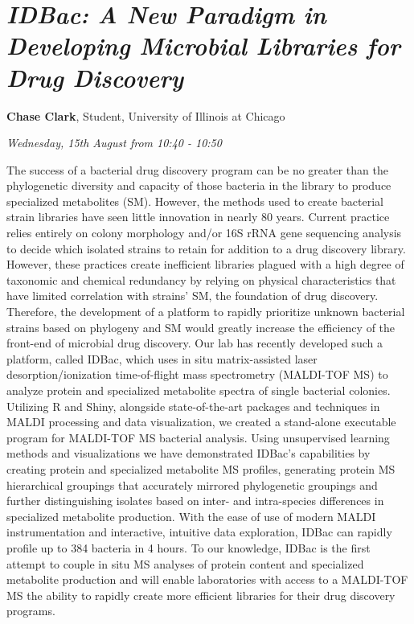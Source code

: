 \documentclass[]{book}
\theoremstyle{definition}
\theoremstyle{definition}
\theoremstyle{definition}
\theoremstyle{remark}
\begin{document}
\hypertarget{idbac-a-new-paradigm-in-developing-microbial-libraries-for-drug-discovery}{%
\section{\texorpdfstring{\emph{IDBac: A New Paradigm in Developing
Microbial Libraries for Drug
Discovery}}{IDBac: A New Paradigm in Developing Microbial Libraries for Drug Discovery}}\label{idbac-a-new-paradigm-in-developing-microbial-libraries-for-drug-discovery}}

\textbf{Chase Clark}, Student, University of Illinois at Chicago

\emph{Wednesday, 15th August from 10:40 - 10:50}

The success of a bacterial drug discovery program can be no greater than
the phylogenetic diversity and capacity of those bacteria in the library
to produce specialized metabolites (SM). However, the methods used to
create bacterial strain libraries have seen little innovation in nearly
80 years. Current practice relies entirely on colony morphology and/or
16S rRNA gene sequencing analysis to decide which isolated strains to
retain for addition to a drug discovery library. However, these
practices create inefficient libraries plagued with a high degree of
taxonomic and chemical redundancy by relying on physical characteristics
that have limited correlation with strains' SM, the foundation of drug
discovery. Therefore, the development of a platform to rapidly
prioritize unknown bacterial strains based on phylogeny and SM would
greatly increase the efficiency of the front-end of microbial drug
discovery. Our lab has recently developed such a platform, called IDBac,
which uses in situ matrix-assisted laser desorption/ionization
time-of-flight mass spectrometry (MALDI-TOF MS) to analyze protein and
specialized metabolite spectra of single bacterial colonies. Utilizing R
and Shiny, alongside state-of-the-art packages and techniques in MALDI
processing and data visualization, we created a stand-alone executable
program for MALDI-TOF MS bacterial analysis. Using unsupervised learning
methods and visualizations we have demonstrated IDBac's capabilities by
creating protein and specialized metabolite MS profiles, generating
protein MS hierarchical groupings that accurately mirrored phylogenetic
groupings and further distinguishing isolates based on inter- and
intra-species differences in specialized metabolite production. With the
ease of use of modern MALDI instrumentation and interactive, intuitive
data exploration, IDBac can rapidly profile up to 384 bacteria in 4
hours. To our knowledge, IDBac is the first attempt to couple in situ MS
analyses of protein content and specialized metabolite production and
will enable laboratories with access to a MALDI-TOF MS the ability to
rapidly create more efficient libraries for their drug discovery
programs.
\end{document}
